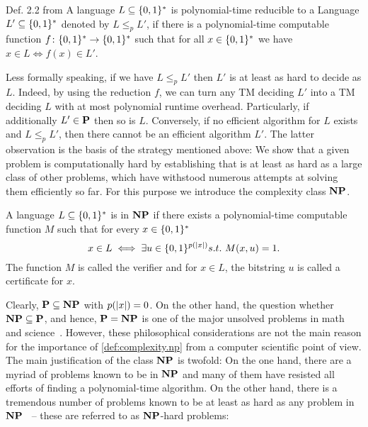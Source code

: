\begin{definition}{Def. 2.2 from \cite{Arora_2009_Computational}}
  \label{def:complexity.reducibility}
  A language $L \subset \BitStrings$ is polynomial-time reducible to a Language $L' \subset \BitStrings$ denoted by $L \le_p L'$, if there is a polynomial-time computable function $f\colon \BitStrings \to \BitStrings$ such that for all $x \in \BitStrings$ we have $x \in L \iff f(x) \in L'$.
\end{definition}

Less formally speaking, if we have $L \le_p L'$ then $L'$ is at least as hard to decide as $L$.
Indeed, by using the reduction $f$, we can turn any TM deciding $L'$ into a TM deciding $L$ with at most polynomial runtime overhead.
Particularly, if additionally $L' \in \P$ then so is $L$.
Conversely, if no efficient algorithm for $L$ exists and $L \le_p L'$, then there cannot be an efficient algorithm $L'$.
The latter observation is the basis of the strategy mentioned above:
We show that a given problem is computationally hard by establishing that is at least as hard as a large class of other problems, which have withstood numerous attempts at solving them efficiently so far.
For this purpose we introduce the complexity class $\NP$.

\begin{definition}
  \label{def:complexity.np}
  A language $L \subset \BitStrings$ is in $\NP$ if there exists a polynomial-time computable function $M$ such that for every $x \in \BitStrings$
  \[
    x \in L \iff \exists u \in \{ 0, 1 \}^{p(\abs{x})} s.t.\ M(x, u) = 1.
  \]
  The function $M$ is called the verifier and for $x \in L$, the bitstring $u$ is called a certificate for $x$.
\end{definition}

Clearly, $\P \subset \NP$ with $p(\abs{x}) = 0$.
On the other hand, the question whether $\NP \subset \P$, and hence, $\P = \NP$ is one of the major unsolved problems in math and science~\cite{Cook_2000_P,Aaronson_????_P,Garey_2002_Computers}.
However, these philosophical considerations are not the main reason for the importance of \cref{def:complexity.np} from a computer scientific point of view.
The main justification of the class $\NP$ is twofold:
On the one hand, there are a myriad of problems known to be in $\NP$ and many of them have resisted all efforts of finding a polynomial-time algorithm.
On the other hand, there is a tremendous number of problems known to be at least as hard as any problem in $\NP$~\cite{Garey_2002_Computers} -- these are referred to as $\NP$-hard problems:

